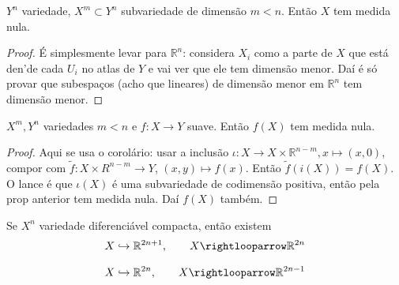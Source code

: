 \begin{prop}\leavevmode
\(Y^n\) variedade, \(X^m \subset Y^n\) subvariedade de dimensão \(m <n\). Então \(X\) tem medida nula.
\end{prop}

\begin{proof}\leavevmode
É simplesmente levar para \(\mathbb{R}^n\): considera \(X_i\) como a parte de \(X\) que está den'de cada  \(U_i\) no atlas de \(Y\) e vai ver que ele tem dimensão menor. Daí é só provar que subespaços (acho que lineares) de dimensão menor em \(\mathbb{R}^n\) tem dimensão menor.
\end{proof}

\begin{coro}[Minisard]\leavevmode
\(X^m,Y^n\) variedades \(m<n\)  e \(f:X \to Y\) suave. Então \(f(X)\) tem medida nula.
\end{coro}

\begin{proof}\leavevmode
Aqui se usa o corolário: usar a inclusão \(\iota:X \to X \times \mathbb{R}^{n-m},x \mapsto (x,0)\), compor com \(\tilde{f}:X \times R^{n-m}\to Y\), \((x,y) \mapsto  f(x)\). Então \(\tilde{f}(i(X))=f(X)\). O lance é que \(\iota(X)\) é uma subvariedade de codimensão positiva, então pela prop anterior tem medida nula. Daí $f(X)$ também.
\end{proof}

\begin{coro}\leavevmode
	Se \(X^n\) variedade diferenciável compacta, então existem 
	\[X \hookrightarrow \mathbb{R}^{2n+1},\qquad  X\rightlooparrow \mathbb{R}^{2n}\]
\end{coro}

\begin{thm}\leavevmode
\[X \hookrightarrow \mathbb{R}^{2n},\qquad  X\rightlooparrow \mathbb{R}^{2n-1}\]
\end{thm}

